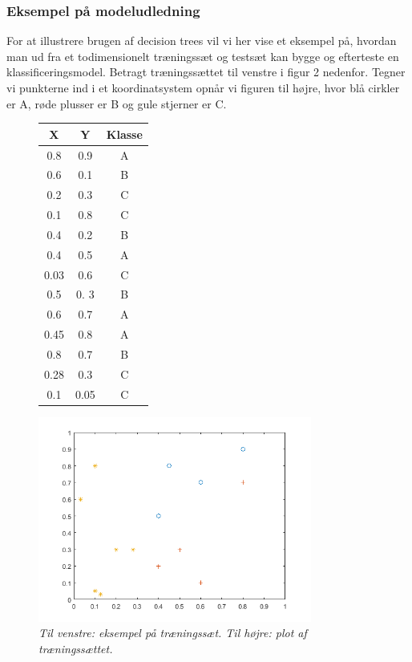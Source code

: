 \documentclass{article}
\begin{document}
\subsubsection{Eksempel på modeludledning}
For at illustrere brugen af decision trees vil vi her vise et eksempel på, hvordan man ud fra et todimensionelt træningssæt og testsæt kan bygge og efterteste en klassificeringsmodel. Betragt træningssættet til venstre i figur 2 nedenfor. Tegner vi punkterne ind i et koordinatsystem opnår vi figuren til højre, hvor blå cirkler er A, røde plusser er B og gule stjerner er C.

\begin{figure}[H]
	\begin{minipage}[t]{0.27\linewidth}
		\begin{flushleft}
			\begin{tabular}{c|c|c}
				X & Y & Klasse\\
				\hline
				0.8 & 0.9 & A\\
				0.6 & 0.1 & B\\
				0.2 & 0.3 & C\\
				0.1 & 0.8 & C\\
				0.4 & 0.2 & B\\
				0.4 & 0.5 & A\\
				0.03 & 0.6 & C\\
				0.5 & 0. 3 & B\\
				0.6 & 0.7 & A\\
				0.45 & 0.8 & A\\
				0.8 & 0.7 & B\\
				0.28 & 0.3 & C\\
				0.1 & 0.05 & C
			\end{tabular}
		\end{flushleft}
	\end{minipage}
	\begin{minipage}[t]{0.25\linewidth}
		\begin{flushright}
			\includegraphics[width=9cm]{decision_tree_example_plot}
		\end{flushright}
	\end{minipage}
	\caption{\textit{Til venstre: eksempel på træningssæt. Til højre: plot af træningssættet.}}
\end{figure}
\end{document}
